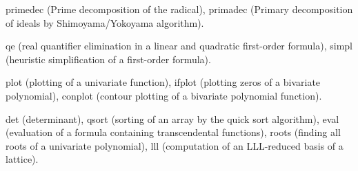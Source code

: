 \documentclass[twocolumn]{article}
\begin{document}
\medbreak
\noindent
{} 

\noindent
{\color{red} primedec} (Prime decomposition of the radical),
{\color{red} primadec} (Primary decomposition of ideals by Shimoyama/Yokoyama algorithm).

\medbreak

\noindent
{} 

\noindent
{\color{red} qe} (real quantifier elimination in a linear and 
quadratic first-order formula),
{\color{red} simpl} (heuristic simplification of a first-order formula).

\medbreak

\noindent
{} 

\noindent
{\color{red} plot} (plotting of a univariate function),
{\color{red} ifplot} (plotting zeros of a bivariate polynomial),
{\color{red} conplot} (contour plotting of a bivariate polynomial function).

\medbreak

\noindent
{} 

\noindent
{\color{red} det} (determinant),
{\color{red} qsort} (sorting of an array by the quick sort algorithm),
{\color{red} eval} (evaluation of a formula containing transcendental functions),
{\color{red} roots} (finding all roots of a univariate polynomial),
{\color{red} lll} (computation of an LLL-reduced basis of a lattice).

\medbreak
\vfill
\noindent
\rightline{ {\color{red} {\tt http://www.openxm.org} }}
\end{document}
